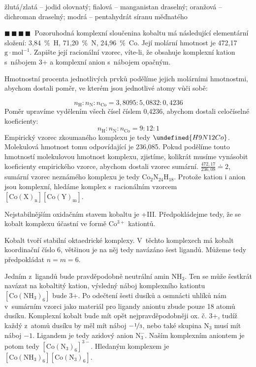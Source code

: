 \documentclass{book}
\let\ch\undefined
\newcommand{\ctyri}{$\blacksquare \, \blacksquare \, \blacksquare \, \blacksquare \; \; $}
\renewenvironment{quotation}{\par}{\par} %
\begin{document}
žlutá/zlatá -- jodid olovnatý; fialová -- manganistan draselný;
oranžová -- dichroman draselný; modrá -- pentahydrát síranu měďnatého

\hrulefill %
\begin{quotation}
\ctyri Pozoruhodná komplexní sloučenina kobaltu má následující elementární
složení: 3,84~\%~H, 71,20~\%~N, 24,96~\%~Co. Její molární hmotnost
je 472,17 $\mathrm{g\cdot mol^{-1}}$. Zapište její racionální vzorec, víte-li, že obsahuje komplexní kation s~nábojem 3+ a komplexní anion s~nábojem opačným.
\end{quotation} \dotfill \par 
Hmotnostní procenta jednotlivých prvků podělíme jejich molárními hmotnostmi,
abychom dostali poměr, ve kterém jsou jednotlivé atomy vůči sobě:

\[
n_{\mathrm{H}}:n_{\mathrm{N}}:n_{\mathrm{Co}}=3,8095:5,0832:0,4236
\]
Poměr upravíme vydělením všech čísel číslem 0,4236, abychom dostali
celočíselné koeficienty:
\[
n_{\mathrm{H}}:n_{\mathrm{N}}:n_{\mathrm{Co}}=9:12:1
\]
Empirický vzorec zkoumaného komplexu je tedy $\ch{H9N12Co}$.
Molekulová hmotnost tomu odpovídající je 236,085. Pokud podělíme touto
hmotností molekulovou hmotnost komplexu, zjistíme, kolikrát musíme
vynásobit koeficienty empirického vzorce, abychom dostali vzorec sumární.
$\frac{472,17}{236,08}\doteq2$, sumární vzorec neznámého komplexu
je tedy $\mathrm{Co_{2}N_{24}H_{18}}$. Protože kation i anion jsou
komplexní, hledáme komplex s~racionálním vzorcem $\mathrm{[Co(X)_{n}][Co(Y)_{m}]}$. 

Nejstabilnějším oxidačním stavem kobaltu je +III. Předpokládejme tedy,
že se kobalt komplexu účastní ve formě $\mathrm{Co^{3+}}$ kationtů.

Kobalt tvoří stabilní oktaedrické komplexy. V~těchto komplexech má
kobalt koordinační číslo 6, většinou je na něj tedy navázáno šest
ligandů. Můžeme tedy předpokládat $n=m=6$.

Jedním z~ligandů bude pravděpodobně neutrální amin $\mathrm{NH_{3}}$.
Ten se může šestkrát navázat na kobaltitý kation, výsledný náboj komplexního
kationtu $\mathrm{[Co(NH_{3})_{6}]}$ bude 3+. Po odečtení šesti dusíků
a osmnácti uhlíků nám v~sumárním vzorci jako materiál pro ligandy
aniontu zbude pouze 18 atomů dusíku. Komplexní kobalt bude mít opět
nejpravděpodobněji ox. č. 3+, tudíž každý z~atomů dusíku by měl mít
náboj $-\nicefrac{1}{3}$, nebo také skupina $\mathrm{N_{3}}$ musí
mít náboj $-1$. Ligandem je tedy azidový anion  $\mathrm{N_{3}^{-}}$.
Naším komplexním aniontem je potom tedy $\mathrm{[Co(N_{3})_{6}]^{3-}}$.  Hledaným komplexem je $\mathrm{[Co(NH_{3})_{6}][Co(N_{3})_{6}]}$.
\end{document}
